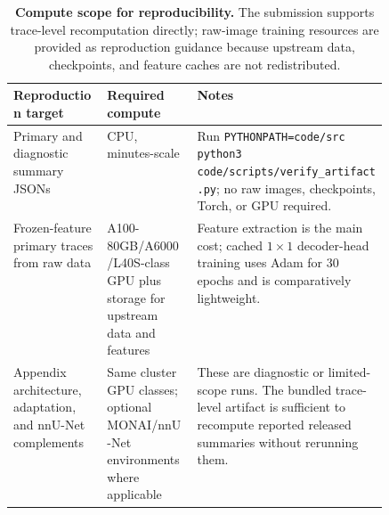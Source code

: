 \begin{table}[!htbp]
  \caption{\textbf{Compute scope for reproducibility.} The submission supports
  trace-level recomputation directly; raw-image training resources are provided
  as reproduction guidance because upstream data, checkpoints, and feature caches
  are not redistributed.}
  \label{tab:compute-scope}
  \centering\scriptsize
  \setlength{\tabcolsep}{3pt}
  \begin{tabularx}{\linewidth}{p{0.25\linewidth}p{0.24\linewidth}Y}
    \toprule
    Reproduction target & Required compute & Notes \\
    \midrule
    Primary and diagnostic summary JSONs & CPU, minutes-scale & Run
    \texttt{PYTHONPATH=code/src python3 code/scripts/verify\_artifact.py}; no
    raw images, checkpoints, Torch, or GPU required. \\
    Frozen-feature primary traces from raw data & A100-80GB/A6000/L40S-class GPU
    plus storage for upstream data and features & Feature extraction is
    the main cost; cached $1{\times}1$ decoder-head training uses Adam for 30
    epochs and is comparatively lightweight. \\
    Appendix architecture, adaptation, and nnU-Net complements & Same cluster
    GPU classes; optional MONAI/nnU-Net environments where applicable & These
    are diagnostic or limited-scope runs. The bundled trace-level artifact is
    sufficient to recompute reported released summaries without rerunning them. \\
    \bottomrule
  \end{tabularx}
\end{table}

